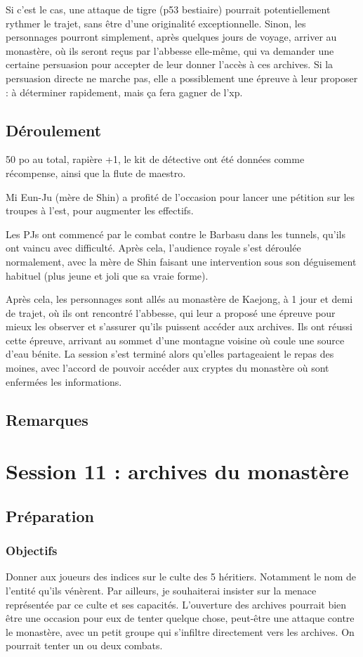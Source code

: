 \documentclass[10pt,a4paper]{book}
\begin{document}
Si c'est le cas, une attaque de tigre (p53 bestiaire) pourrait potentiellement rythmer le trajet, sans être d'une originalité exceptionnelle. Sinon, les personnages pourront simplement, après quelques jours de voyage, arriver au monastère, où ils seront reçus par l'abbesse elle-même, qui va demander une certaine persuasion pour accepter de leur donner l'accès à ces archives. Si la persuasion directe ne marche pas, elle a possiblement une épreuve à leur proposer : à déterminer rapidement, mais ça fera gagner de l'xp.

\subsection{Déroulement}
50 po au total, rapière +1, le kit de détective ont été données comme récompense, ainsi que la flute de maestro.

Mi Eun-Ju (mère de Shin) a profité de l'occasion pour lancer une pétition sur les troupes à l'est, pour augmenter les effectifs.

Les PJs ont commencé par le combat contre le Barbasu dans les tunnels, qu'ils ont vaincu avec difficulté. Après cela, l'audience royale s'est déroulée normalement, avec la mère de Shin faisant une intervention sous son déguisement habituel (plus jeune et joli que sa vraie forme).

Après cela, les personnages sont allés au monastère de Kaejong, à 1 jour et demi de trajet, où ils ont rencontré l'abbesse, qui leur a proposé une épreuve pour mieux les observer et s'assurer qu'ils puissent accéder aux archives. Ils ont réussi cette épreuve, arrivant au sommet d'une montagne voisine où coule une source d'eau bénite. La session s'est terminé alors qu'elles partageaient le repas des moines, avec l'accord de pouvoir accéder aux cryptes du monastère où sont enfermées les informations.
\subsection{Remarques}
\section{Session 11 : archives du monastère}
\subsection{Préparation}
\subsubsection{Objectifs}
Donner aux joueurs des indices sur le culte des 5 héritiers. Notamment le nom de l'entité qu'ils vénèrent. Par ailleurs, je souhaiterai insister sur la menace représentée par ce culte et ses capacités. L'ouverture des archives pourrait bien être une occasion pour eux de tenter quelque chose, peut-être une attaque contre le monastère, avec un petit groupe qui s'infiltre directement vers les archives. On pourrait tenter un ou deux combats.
\end{document}
